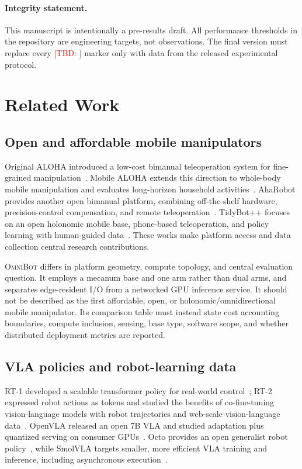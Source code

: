 \documentclass[letterpaper,10pt,conference]{ieeeconf}
\newcommand{\TBD}[1]{\textcolor{red}{[TBD: #1]}}
\newcommand{\OmniBot}{\textsc{OmniBot}}
\begin{document}
\paragraph{Integrity statement.} This manuscript is intentionally a pre-results draft. All performance thresholds in the repository are engineering targets, not observations. The final version must replace every \TBD{} marker only with data from the released experimental protocol.

\section{Related Work}
\label{sec:related}

\subsection{Open and affordable mobile manipulators}

Original ALOHA introduced a low-cost bimanual teleoperation system for fine-grained manipulation~\cite{zhao2023aloha}. Mobile ALOHA extends this direction to whole-body mobile manipulation and evaluates long-horizon household activities~\cite{fu2024mobile}. AhaRobot provides another open bimanual platform, combining off-the-shelf hardware, precision-control compensation, and remote teleoperation~\cite{cui2025aharobot}. TidyBot++ focuses on an open holonomic mobile base, phone-based teleoperation, and policy learning with human-guided data~\cite{wu2025tidybot}. These works make platform access and data collection central research contributions.

\OmniBot{} differs in platform geometry, compute topology, and central evaluation question. It employs a mecanum base and one arm rather than dual arms, and separates edge-resident I/O from a networked GPU inference service. It should not be described as the first affordable, open, or holonomic/omnidirectional mobile manipulator. Its comparison table must instead state cost accounting boundaries, compute inclusion, sensing, base type, software scope, and whether distributed deployment metrics are reported.

\subsection{VLA policies and robot-learning data}

RT-1 developed a scalable transformer policy for real-world control~\cite{brohan2023rt1}; RT-2 expressed robot actions as tokens and studied the benefits of co-fine-tuning vision-language models with robot trajectories and web-scale vision-language data~\cite{zitkovich2023rt2}. OpenVLA released an open 7B VLA and studied adaptation plus quantized serving on consumer GPUs~\cite{kim2025openvla}. Octo provides an open generalist robot policy~\cite{octo2024}, while SmolVLA targets smaller, more efficient VLA training and inference, including asynchronous execution~\cite{shukor2025smolvla}.
\end{document}
